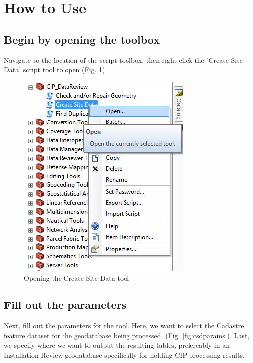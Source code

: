 \documentclass[openany]{book}
\theoremstyle{definition}
\theoremstyle{definition}
\theoremstyle{definition}
\theoremstyle{remark}
\begin{document}
\section{How to Use}\label{how-to-use}

\subsection{Begin by opening the
toolbox}\label{begin-by-opening-the-toolbox}

Navigate to the location of the script toolbox, then right-click the
`Create Site Data' script tool to open (Fig. \ref{fig:csdopen}).

\begin{figure}[H]

{\centering \includegraphics{figures/csd-open} 

}

\caption{Opening the Create Site Data tool}\label{fig:csdopen}
\end{figure}

\subsection{Fill out the parameters}\label{fill-out-the-parameters}

Next, fill out the parameters for the tool. Here, we want to select the
Cadastre feature dataset for the geodatabase being processed. (Fig.
\ref{fig:csdparams}). Last, we specify where we want to output the
resulting tables, prefereably in an Installation Review geodatabase
specifically for holding CIP processing results.
\end{document}
